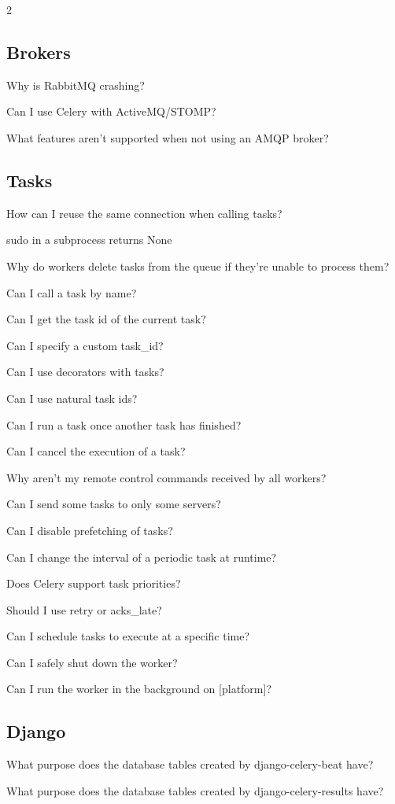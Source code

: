 \documentclass [8pt] {extarticle}
\begin{document}
\begin {multicols} {2}
    \subsection {Brokers}

        Why is RabbitMQ crashing?

        Can I use Celery with ActiveMQ/STOMP?

        What features aren’t supported when not using an AMQP broker?

    \subsection {Tasks}

        How can I reuse the same connection when calling tasks?

        sudo in a subprocess returns None

        Why do workers delete tasks from the queue if they’re unable to process them?

        Can I call a task by name?

        Can I get the task id of the current task?

        Can I specify a custom task\_id?

        Can I use decorators with tasks?

        Can I use natural task ids?

        Can I run a task once another task has finished?

        Can I cancel the execution of a task?

        Why aren’t my remote control commands received by all workers?

        Can I send some tasks to only some servers?

        Can I disable prefetching of tasks?

        Can I change the interval of a periodic task at runtime?

        Does Celery support task priorities?

        Should I use retry or acks\_late?

        Can I schedule tasks to execute at a specific time?

        Can I safely shut down the worker?

        Can I run the worker in the background on [platform]?

    \subsection {Django}

        What purpose does the database tables created by django-celery-beat have?

        What purpose does the database tables created by django-celery-results have?
        \end {multicols}
\end{document}

